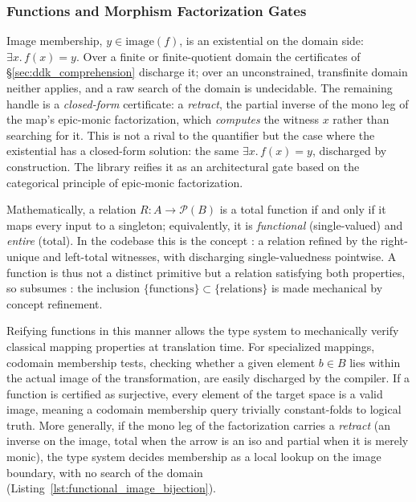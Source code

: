 \documentclass[11pt, a4paper]{article}
\begin{document}
\subsubsection{Functions and Morphism Factorization Gates}
\label{sec:functions_morphism_factorization}

Image membership, $y \in \mathrm{image}(f)$, is an existential on the domain side: $\exists x.\, f(x) = y$.
Over a finite or finite-quotient domain the certificates of §\ref{sec:ddk_comprehension} discharge it; over an unconstrained, transfinite domain neither applies, and a raw search of the domain is undecidable.
The remaining handle is a \emph{closed-form} certificate: a \emph{retract}, the partial inverse of the mono leg of the map's epic-monic factorization, which \emph{computes} the witness $x$ rather than searching for it.
This is not a rival to the quantifier but the case where the existential has a closed-form solution: the same $\exists x.\, f(x)=y$, discharged by construction.
The library reifies it as an architectural gate based on the categorical principle of epic-monic factorization.

Mathematically, a relation $R : A \to \mathcal{P}(B)$ is a total function if and only if it maps every input to a singleton; equivalently, it is \emph{functional} (single-valued) and \emph{entire} (total).
In the codebase this is the concept : a relation refined by the right-unique and left-total witnesses, with  discharging single-valuedness pointwise.
A function is thus not a distinct primitive but a relation satisfying both properties, so  subsumes : the inclusion $\{\text{functions}\} \subset \{\text{relations}\}$ is made mechanical by concept refinement.

Reifying functions in this manner allows the type system to mechanically verify classical mapping properties at translation time.
For specialized mappings, codomain membership tests, checking whether a given element $b \in B$ lies within the actual image of the transformation, are easily discharged by the compiler.
If a function is certified as surjective, every element of the target space is a valid image, meaning a codomain membership query trivially constant-folds to logical truth.
More generally, if the mono leg of the factorization carries a \emph{retract} (an inverse on the image, total when the arrow is an iso and partial when it is merely monic), the type system decides membership as a local lookup on the image boundary, with no search of the domain (Listing~\ref{lst:functional_image_bijection}).
\end{document}
